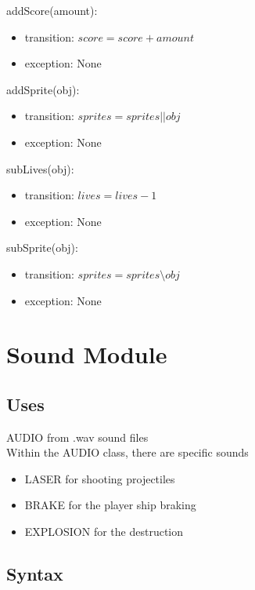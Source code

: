 \documentclass[12pt]{article}
\begin{document}
\noindent addScore(amount):
\begin{itemize}
    \item transition: $ score = score + amount $
    \item exception: None
\end{itemize}

\noindent addSprite(obj):
\begin{itemize}
    \item transition: $ sprites = sprites || obj $
    \item exception: None
\end{itemize}

\noindent subLives(obj):
\begin{itemize}
    \item transition: $ lives = lives - 1 $
    \item exception: None
\end{itemize}

\noindent subSprite(obj):
\begin{itemize}
    \item transition: $ sprites = sprites \setminus obj $
    \item exception: None
\end{itemize}

\newpage

\section*{Sound Module}

\subsection*{Uses}

AUDIO from .wav sound files\\
Within the AUDIO class, there are specific sounds\\
\begin{itemize}
  \item LASER for shooting projectiles\\
  \item BRAKE for the player ship braking\\
  \item EXPLOSION for the destruction\\
\end{itemize}

\subsection*{Syntax}
\end{document}
